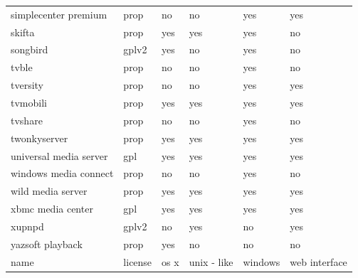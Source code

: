 \documentclass{article}
\begin{document}
\begin{tabular}{llllll}
simplecenter premium & prop & no & no & yes & yes \\
skifta & prop & yes & yes & yes & no \\
songbird & gplv2 & yes & no & yes & no \\
tvble & prop & no & no & yes & no \\
tversity & prop & no & no & yes & yes \\
tvmobili & prop & yes & yes & yes & yes \\
tvshare & prop & no & no & yes & no \\
twonkyserver & prop & yes & yes & yes & yes \\
universal media server & gpl & yes & yes & yes & yes \\
windows media connect & prop & no & no & yes & no \\
wild media server & prop & yes & yes & yes & yes \\
xbmc media center & gpl & yes & yes & yes & yes \\
xupnpd & gplv2 & no & yes & no & yes \\
yazsoft playback & prop & yes & no & no & no \\
name & license & os x & unix - like & windows & web interface \\
\bottomrule
\end{tabular}
\end{document}

